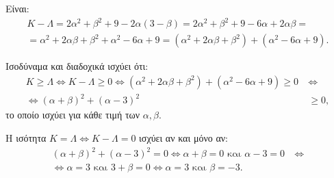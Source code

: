 
\begin{alist}
\item Είναι:
\begin{gather*}
K - \Lambda = 2\alpha^2 + \beta^2 + 9 - 2\alpha(3 - \beta) = 2\alpha^2 + \beta^2 + 9 - 6\alpha + 2\alpha\beta = \\
= \alpha^2 + 2\alpha\beta + \beta^2 + \alpha^2 - 6\alpha + 9 = (\alpha^2 + 2\alpha\beta + \beta^2) + (\alpha^2 - 6\alpha + 9).
\end{gather*}

\item Ισοδύναμα και διαδοχικά ισχύει ότι:
\begin{align*}
K \ge \Lambda \Leftrightarrow K - \Lambda \ge 0 \Leftrightarrow (\alpha^2 + 2\alpha\beta + \beta^2) + (\alpha^2 - 6\alpha + 9) \ge 0 \ &\Leftrightarrow \\
\Leftrightarrow (\alpha + \beta)^2 + (\alpha - 3)^2 &\ge 0,
\end{align*}
το οποίο ισχύει για κάθε τιμή των $\alpha, \beta$.

\item Η ισότητα $K = \Lambda \Leftrightarrow K - \Lambda = 0$ ισχύει αν και μόνο αν:
\begin{align*}
(\alpha + \beta)^2 + (\alpha - 3)^2 = 0 \Leftrightarrow \alpha + \beta = 0 \text{ και } \alpha - 3 = 0 \ &\Leftrightarrow \\
\Leftrightarrow \alpha = 3 \text{ και } 3 + \beta = 0 \Leftrightarrow \alpha = 3 \text{ και } \beta = -3.&
\end{align*}
\end{alist}


